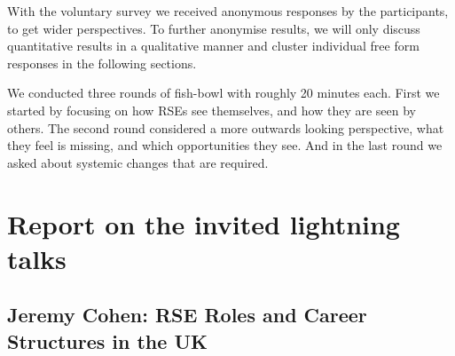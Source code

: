 \documentclass{eceasst}
\begin{document}
With the voluntary survey we received anonymous responses by the participants,
to get wider perspectives.
To further anonymise results, we will only discuss quantitative results in a qualitative manner
and cluster individual free form responses in the following sections.

We conducted three rounds of fish-bowl with roughly 20 minutes each. First we started by focusing on
how RSEs see themselves, and how they are seen by others.
The second round considered a more outwards looking perspective, what they feel is missing, and which opportunities they see.
And in the last round we asked about systemic changes that are required.

\section{Report on the invited lightning talks}

\subsection{Jeremy Cohen: RSE Roles and Career Structures in the UK}
\end{document}
